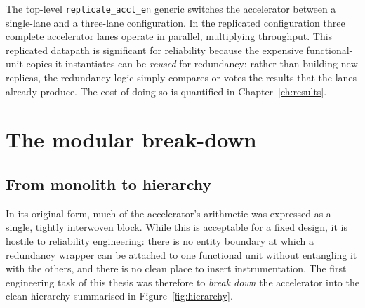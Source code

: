 The top-level \texttt{replicate\_accl\_en} generic switches the accelerator
between a single-lane and a three-lane configuration. In the replicated
configuration three complete accelerator lanes operate in parallel, multiplying
throughput. This replicated datapath is significant for reliability because the
expensive functional-unit copies it instantiates can be \emph{reused} for
redundancy: rather than building new replicas, the redundancy logic simply
compares or votes the results that the lanes already produce. The cost of doing
so is quantified in Chapter~\ref{ch:results}.

\section{The modular break-down}
\label{sec:arch-breakdown}

\subsection{From monolith to hierarchy}

In its original form, much of the accelerator's arithmetic was expressed as a
single, tightly interwoven block. While this is acceptable for a fixed design,
it is hostile to reliability engineering: there is no entity boundary at which a
redundancy wrapper can be attached to one functional unit without entangling it
with the others, and there is no clean place to insert instrumentation. The
first engineering task of this thesis was therefore to \emph{break down} the
accelerator into the clean hierarchy summarised in Figure~\ref{fig:hierarchy}.

